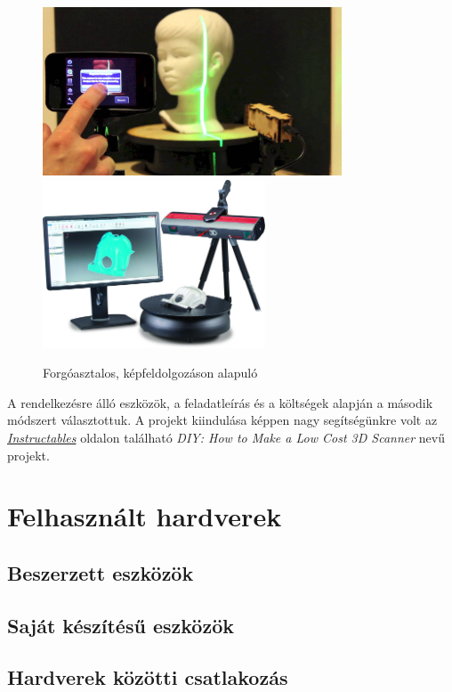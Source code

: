 \documentclass[12pt,a4paper]{article}
\begin{document}
	\begin{figure}[h!]
		\begin{center}
			\includegraphics[height=5cm]{images/Mobile_Scan.jpg}
			\includegraphics[height=5cm]{images/PC_Scan.jpg}
		\end{center}
		\caption{Forgóasztalos, képfeldolgozáson alapuló\cite{MobileScan}\cite{PCScan}}
	\end{figure}

	A rendelkezésre álló eszközök, a feladatleírás és a költségek alapján a második módszert választottuk. A projekt kiindulása képpen nagy segítségünkre volt az \href{http://www.instructables.com/id/3D-Laser-Scanning-DIY/}{\textit{Instructables}} oldalon található \textit{DIY: How to Make a Low Cost 3D Scanner}\cite{LaserScannerProjekt} nevű projekt.

\section{Felhasznált hardverek}
\subsection{Beszerzett eszközök}
\subsection{Saját készítésű eszközök}
\subsection{Hardverek közötti csatlakozás}
\end{document}
